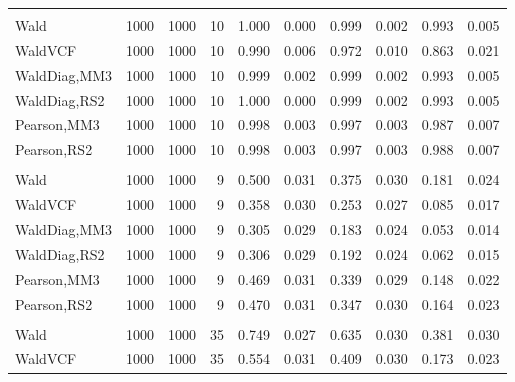 \documentclass[
]{article}
\begin{document}
\begin{table}[H]
{\begin{tabular}[t]{lrrrrrrlrr}
\addlinespace[0.3em]
\multicolumn{10}{l}{\textbf{1F 15V}}\\
\hspace{1em}Wald & 1000 & 1000 & 10 & 1.000 & 0.000 & 0.999 & 0.002 & 0.993 & 0.005\\
\hspace{1em}WaldVCF & 1000 & 1000 & 10 & 0.990 & 0.006 & 0.972 & 0.010 & 0.863 & 0.021\\
\hspace{1em}WaldDiag,MM3 & 1000 & 1000 & 10 & 0.999 & 0.002 & 0.999 & 0.002 & 0.993 & 0.005\\
\hspace{1em}WaldDiag,RS2 & 1000 & 1000 & 10 & 1.000 & 0.000 & 0.999 & 0.002 & 0.993 & 0.005\\
\hspace{1em}Pearson,MM3 & 1000 & 1000 & 10 & 0.998 & 0.003 & 0.997 & 0.003 & 0.987 & 0.007\\
\hspace{1em}Pearson,RS2 & 1000 & 1000 & 10 & 0.998 & 0.003 & 0.997 & 0.003 & 0.988 & 0.007\\
\addlinespace[0.3em]
\multicolumn{10}{l}{\textbf{2F 10V}}\\
\hspace{1em}Wald & 1000 & 1000 & 9 & 0.500 & 0.031 & 0.375 & 0.030 & 0.181 & 0.024\\
\hspace{1em}WaldVCF & 1000 & 1000 & 9 & 0.358 & 0.030 & 0.253 & 0.027 & 0.085 & 0.017\\
\hspace{1em}WaldDiag,MM3 & 1000 & 1000 & 9 & 0.305 & 0.029 & 0.183 & 0.024 & 0.053 & 0.014\\
\hspace{1em}WaldDiag,RS2 & 1000 & 1000 & 9 & 0.306 & 0.029 & 0.192 & 0.024 & 0.062 & 0.015\\
\hspace{1em}Pearson,MM3 & 1000 & 1000 & 9 & 0.469 & 0.031 & 0.339 & 0.029 & 0.148 & 0.022\\
\hspace{1em}Pearson,RS2 & 1000 & 1000 & 9 & 0.470 & 0.031 & 0.347 & 0.030 & 0.164 & 0.023\\
\addlinespace[0.3em]
\multicolumn{10}{l}{\textbf{3F 15V}}\\
\hspace{1em}Wald & 1000 & 1000 & 35 & 0.749 & 0.027 & 0.635 & 0.030 & 0.381 & 0.030\\
\hspace{1em}WaldVCF & 1000 & 1000 & 35 & 0.554 & 0.031 & 0.409 & 0.030 & 0.173 & 0.023\\

\end{tabular}}
\end{table}
\end{document}
